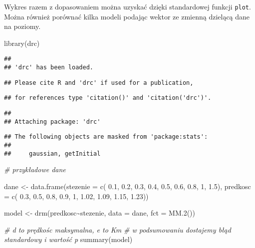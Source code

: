 \documentclass[
]{book}
\newenvironment{Shaded}{\begin{snugshade}}{\end{snugshade}}
\newcommand{\AttributeTok}[1]{\textcolor[rgb]{0.77,0.63,0.00}{#1}}
\newcommand{\CommentTok}[1]{\textcolor[rgb]{0.56,0.35,0.01}{\textit{#1}}}
\newcommand{\DecValTok}[1]{\textcolor[rgb]{0.00,0.00,0.81}{#1}}
\newcommand{\FloatTok}[1]{\textcolor[rgb]{0.00,0.00,0.81}{#1}}
\newcommand{\FunctionTok}[1]{\textcolor[rgb]{0.00,0.00,0.00}{#1}}
\newcommand{\NormalTok}[1]{#1}
\newcommand{\OtherTok}[1]{\textcolor[rgb]{0.56,0.35,0.01}{#1}}
\newcommand{\SpecialCharTok}[1]{\textcolor[rgb]{0.00,0.00,0.00}{#1}}
\begin{document}
Wykres razem z dopasowaniem można uzyskać dzięki standardowej funkcji \texttt{plot}. Można również porównać kilka modeli podając wektor ze zmienną dzielącą dane na poziomy.

\begin{Shaded}
\begin{Highlighting}[]
\FunctionTok{library}\NormalTok{(drc)}
\end{Highlighting}
\end{Shaded}

\begin{verbatim}
## 
## 'drc' has been loaded.
\end{verbatim}

\begin{verbatim}
## Please cite R and 'drc' if used for a publication,
\end{verbatim}

\begin{verbatim}
## for references type 'citation()' and 'citation('drc')'.
\end{verbatim}

\begin{verbatim}
## 
## Attaching package: 'drc'
\end{verbatim}

\begin{verbatim}
## The following objects are masked from 'package:stats':
## 
##     gaussian, getInitial
\end{verbatim}

\begin{Shaded}
\begin{Highlighting}[]
\CommentTok{\# przykładowe dane}

\NormalTok{dane }\OtherTok{\textless{}{-}} \FunctionTok{data.frame}\NormalTok{(}\AttributeTok{stezenie  =} \FunctionTok{c}\NormalTok{( }\FloatTok{0.1}\NormalTok{, }\FloatTok{0.2}\NormalTok{, }\FloatTok{0.3}\NormalTok{, }\FloatTok{0.4}\NormalTok{, }\FloatTok{0.5}\NormalTok{, }\FloatTok{0.6}\NormalTok{, }\FloatTok{0.8}\NormalTok{, }\DecValTok{1}\NormalTok{, }\FloatTok{1.5}\NormalTok{), }
                   \AttributeTok{predkosc =} \FunctionTok{c}\NormalTok{( }\FloatTok{0.3}\NormalTok{, }\FloatTok{0.5}\NormalTok{, }\FloatTok{0.8}\NormalTok{, }\FloatTok{0.9}\NormalTok{, }\DecValTok{1}\NormalTok{, }\FloatTok{1.02}\NormalTok{, }\FloatTok{1.09}\NormalTok{, }\FloatTok{1.15}\NormalTok{, }\FloatTok{1.23}\NormalTok{))}

\NormalTok{model }\OtherTok{\textless{}{-}} \FunctionTok{drm}\NormalTok{(predkosc}\SpecialCharTok{\textasciitilde{}}\NormalTok{stezenie, }\AttributeTok{data =}\NormalTok{ dane, }\AttributeTok{fct =} \FunctionTok{MM.2}\NormalTok{())}

\CommentTok{\# d to prędkośc maksymalna, e to Km}
\CommentTok{\# w podsumowaniu dostajemy błąd standardowy i wartość p}
\FunctionTok{summary}\NormalTok{(model)}
\end{Highlighting}
\end{Shaded}
\end{document}
